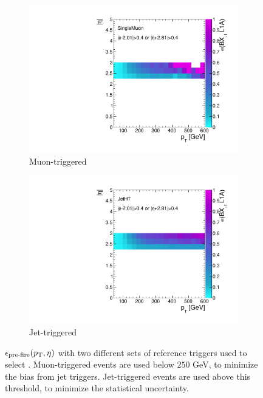 \begin{figure}[]
    \begin{center}
        \begin{subfigure}[t]{0.49\textwidth}
            \includegraphics[width=\textwidth]{figures/vbf/triggers/SingleMuon_spike_finor_pteta_ratio.pdf}
            \caption{Muon-triggered}
        \end{subfigure}
        \begin{subfigure}[t]{0.49\textwidth}
            \includegraphics[width=\textwidth]{figures/vbf/triggers/JetHT_spike_finor_pteta_ratio.pdf}
            \caption{Jet-triggered}
        \end{subfigure}
        \caption{$\epsilon_\text{pre-fire}(p_\mathrm{T},\eta)$ with two different sets of reference triggers used to select .
                 Muon-triggered events are used below $250$ GeV, to minimize the bias from jet triggers.
                 Jet-triggered events are used above this threshold, to minimize the statistical uncertainty.}
        \label{fig:vbf:pre_eff2_pteta1}
    \end{center}
\end{figure}

